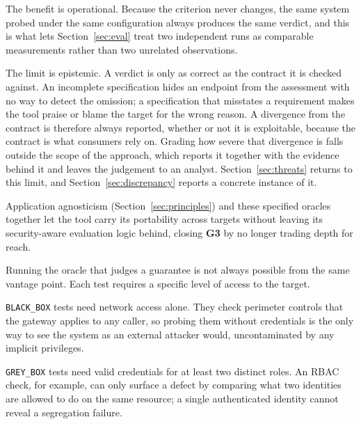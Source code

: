 The benefit is operational. Because the criterion never changes, the same system probed under the same configuration always produces the same verdict, and this is what lets Section~\ref{sec:eval} treat two independent runs as comparable measurements rather than two unrelated observations.

The limit is epistemic. A verdict is only as correct as the contract it is checked against.
An incomplete specification hides an endpoint from the assessment with no way to detect the omission; a specification that misstates a requirement makes the tool praise or blame the target for the wrong reason.
A divergence from the contract is therefore always reported, whether or not it is exploitable, because the contract is what consumers rely on. Grading how severe that divergence is falls outside the scope of the approach, which reports it together with the evidence behind it and leaves the judgement to an analyst.
Section~\ref{sec:threats} returns to this limit, and Section~\ref{sec:discrepancy} reports a concrete instance of it.

Application agnosticism (Section~\ref{sec:principles}) and these specified oracles together let the tool carry its portability across targets without leaving its security-aware evaluation logic behind, closing \textbf{G3} by no longer trading depth for reach.

Running the oracle that judges a guarantee is not always possible from the same vantage point. Each test requires a specific level of access to the target.%

\texttt{BLACK\_BOX} tests need network access alone.
They check perimeter controls that the gateway applies to any caller, so probing them without credentials is the only way to see the system as an external attacker would, uncontaminated by any implicit privileges.

\texttt{GREY\_BOX} tests need valid credentials for at least two distinct roles.
An RBAC check, for example, can only surface a defect by comparing what two identities are allowed to do on the same resource; a single authenticated identity cannot reveal a segregation failure.


